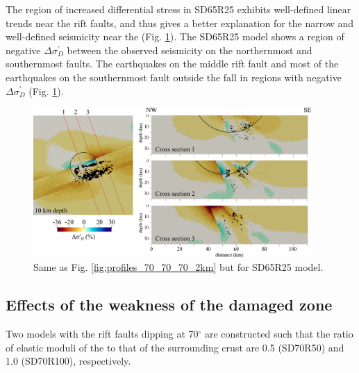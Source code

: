\documentclass[draft]{agujournal2018}
\begin{document}
The region of increased differential stress in SD65R25 exhibits well-defined linear trends near the rift faults, and thus gives a better explanation for the narrow and well-defined seismicity near the    (Fig. \ref{fig:profiles_65_40_40_2km}). The SD65R25 model shows a region of negative $\Delta\sigma_{D}^{\prime}$ between the observed seismicity on the northernmost and southernmost faults. The earthquakes on the middle rift fault and most of the earthquakes on the southernmost fault outside the  fall in regions with negative $\Delta\sigma_{D}^{\prime}$ (Fig. \ref{fig:profiles_65_40_40_2km}).

\begin{figure}[ht]
\centering
\includegraphics[width=25pc]{Figures/SD65R25_profiles.png}
\caption{Same as Fig. \ref{fig:profiles_70_70_70_2km} but for SD65R25 model.}
\label{fig:profiles_65_40_40_2km}
\end{figure}

\subsection{Effects of the weakness of the damaged  zone}
Two models with the rift faults dipping at 70$^{\circ}$ are constructed such that the ratio of elastic moduli of the  to that of the surrounding crust are 0.5 (SD70R50) and 1.0 (SD70R100), respectively.
\end{document}
